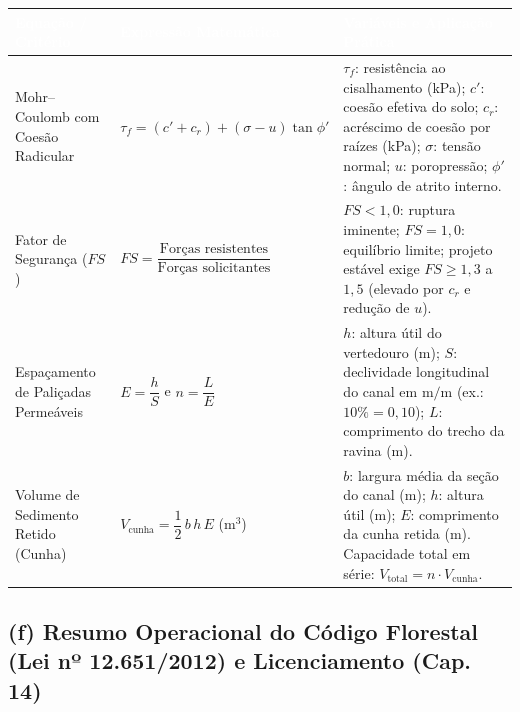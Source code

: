 \begin{center}
\renewcommand{\arraystretch}{1.30}
\small
\begin{tabularx}{\textwidth}{@{}p{3.4cm} p{4.8cm} >{\raggedright\arraybackslash}X@{}}
  \toprule
  \rowcolor{uefsNavy}
  \textcolor{white}{\bfseries Equação / Critério} & \textcolor{white}{\bfseries Expressão Matemática} & \textcolor{white}{\bfseries Variáveis e Aplicação Prática} \\
  \midrule
  Mohr--Coulomb com Coesão Radicular & $\tau_f = (c' + c_r) + (\sigma - u)\tan\phi'$ & $\tau_f$: resistência ao cisalhamento (kPa); $c'$: coesão efetiva do solo; $c_r$: acréscimo de coesão por raízes (kPa); $\sigma$: tensão normal; $u$: poropressão; $\phi'$: ângulo de atrito interno. \\
  \rowcolor{bgGray}
  Fator de Segurança ($FS$) & $FS = \dfrac{\text{Forças resistentes}}{\text{Forças solicitantes}}$ & $FS < 1,0$: ruptura iminente; $FS = 1,0$: equilíbrio limite; projeto estável exige $FS \ge 1,3$ a $1,5$ (elevado por $c_r$ e redução de $u$). \\
  Espaçamento de Paliçadas Permeáveis & $E = \dfrac{h}{S}$ \qquad e \qquad $n = \dfrac{L}{E}$ & $h$: altura útil do vertedouro (m); $S$: declividade longitudinal do canal em $\text{m/m}$ (ex.: $10\% = 0,10$); $L$: comprimento do trecho da ravina (m). \\
  \rowcolor{bgGray}
  Volume de Sedimento Retido (Cunha) & $V_{\text{cunha}} = \dfrac{1}{2}\,b\,h\,E$ \quad ($\text{m}^3$) & $b$: largura média da seção do canal (m); $h$: altura útil (m); $E$: comprimento da cunha retida (m). Capacidade total em série: $V_{\text{total}} = n \cdot V_{\text{cunha}}$. \\
  \bottomrule
\end{tabularx}
\end{center}

\subsection*{(f) Resumo Operacional do Código Florestal (Lei nº 12.651/2012) e Licenciamento (Cap. 14)}

